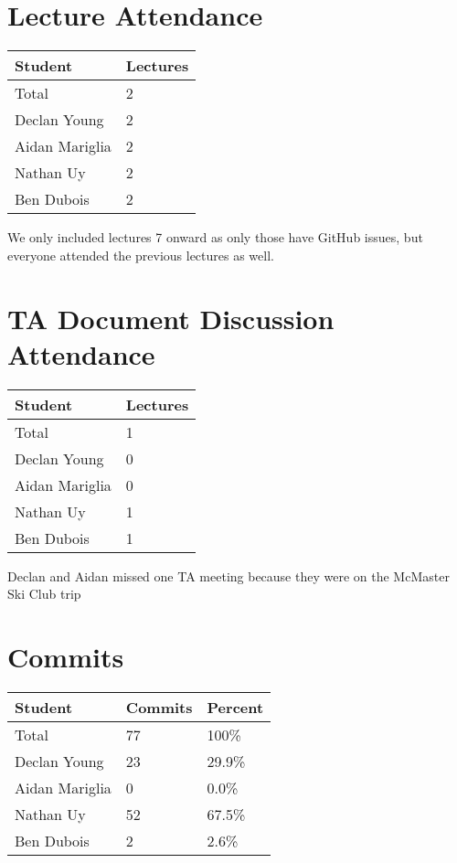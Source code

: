 \documentclass{article}
\begin{document}
\section{Lecture Attendance}

\begin{table}[H]
\centering
\begin{tabular}{ll}
\toprule
\textbf{Student} & \textbf{Lectures}\\
\midrule
Total & 2\\
Declan Young & 2\\
Aidan Mariglia & 2\\
Nathan Uy & 2\\
Ben Dubois & 2\\
\bottomrule
\end{tabular}
\end{table}

We only included lectures 7 onward as only those have GitHub issues, but everyone attended the previous lectures as well.

\section{TA Document Discussion Attendance}

\begin{table}[H]
\centering
\begin{tabular}{ll}
\toprule
\textbf{Student} & \textbf{Lectures}\\
\midrule
Total & 1\\
Declan Young & 0\\
Aidan Mariglia & 0\\
Nathan Uy & 1\\
Ben Dubois & 1\\
\bottomrule
\end{tabular}
\end{table}

Declan and Aidan missed one TA meeting because they were on the McMaster Ski Club trip

\section{Commits}

\begin{table}[H]
\centering
\begin{tabular}{lll}
\toprule
\textbf{Student} & \textbf{Commits} & \textbf{Percent}\\
\midrule
Total & 77 & 100\% \\
Declan Young & 23 & 29.9\% \\
Aidan Mariglia & 0 & 0.0\% \\
Nathan Uy & 52 & 67.5\% \\
Ben Dubois & 2 & 2.6\% \\
\bottomrule
\end{tabular}
\end{table}
\end{document}
